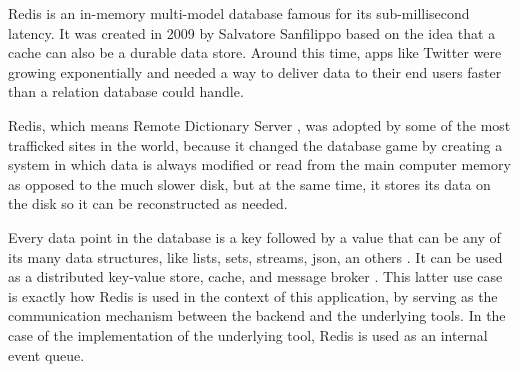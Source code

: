 Redis is an in-memory multi-model database famous for its sub-millisecond
latency. It was created in 2009 by Salvatore Sanfilippo based on the idea that
a cache can also be a durable data store. Around this time, apps like Twitter
were growing exponentially and needed a way to deliver data to their end users
faster than a relation database could handle.

Redis, which means Remote Dictionary Server \cite{redis-meaning}, was adopted
by some of the most trafficked sites in the world, because it changed the
database game by creating a system in which data is always modified or read
from the main computer memory as opposed to the much slower disk, but at the
same time, it stores its data on the disk so it can be reconstructed as needed.

Every data point in the database is a key followed by a value that can be any
of its many data structures, like lists, sets, streams, json, an others
\cite{redis-data-types}. It can be used as a distributed key-value store,
cache, and message broker \cite{redis-usage}. This latter use case is exactly
how Redis is used in the context of this application, by serving as the
communication mechanism between the backend and the underlying tools. In the
case of the implementation of the underlying tool, Redis is used as an internal
event queue.
